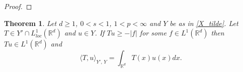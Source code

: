 \documentclass[letterpaper, 11pt,  reqno]{amsart}
\newtheorem{theorem}{Theorem}[section]
\theoremstyle{definition}
\theoremstyle{remark}
\numberwithin{equation}{section}
\newcommand{\bbr}{\mathbb{R}}
\newcommand{\R}{{\mathbb R}}
\begin{document}
\begin{proof}
	\end{proof}
	\begin{theorem}\label{prod_integr}
		Let $d\ge 1$, $0<s<1$, $1<p<\infty$ and $Y$ be as in \eqref{X_tilde}. Let  $T\in {Y}'\cap L^{1}_{loc}(\bbr^d)$ and  $u\in Y$. If $Tu\ge -|f|$ for some $f\in L^{1}(\R^d)$ then $Tu\in L^{1}(\R^d)$ and
		\begin{equation*}
			\langle T, u\rangle_{Y',\, Y}=\int_{\bbr^d}T(x)u(x)dx.
		\end{equation*}
	\end{theorem}
\end{document}
